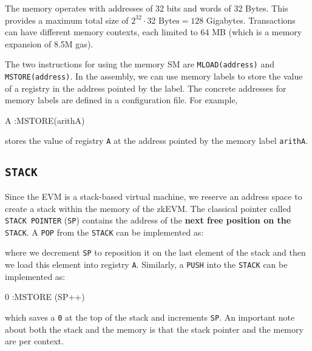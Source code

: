The memory operates with addresses of 32 bits and words of 32 Bytes. This provides a maximum total size of $2^{32} \cdot 32 \text{ Bytes}=128$ Gigabytes. Transactions can have different memory contexts, each limited to 64 MB (which is a memory expansion of 8.5M gas). 

The two instructions for using the memory SM are \texttt{MLOAD(address)} and \texttt{MSTORE(address)}. In the assembly, we can use memory labels to store the value of a registry in the address pointed by the label. The concrete addresses for memory labels are defined in a configuration file. For example, 

\begin{zkasm}
A		:MSTORE(arithA)
\end{zkasm}

stores the value of registry \texttt{A} at the address pointed by the memory label \texttt{arithA}. 






\subsection{\texttt{STACK}}

Since the EVM is a stack-based virtual machine, we reserve an address space to create a stack within the memory of the zkEVM. The classical pointer called \texttt{STACK POINTER} (\texttt{SP}) contains the address of the \textbf{next free position on the} \texttt{STACK}. A \texttt{POP} from the \texttt{STACK} can be implemented as:



where we decrement \texttt{SP} to reposition it on the last element of the stack and
then we load this element into registry \texttt{A}. Similarly, a \texttt{PUSH} into the \texttt{STACK} can be implemented as:

\begin{zkasm}
0		:MSTORE (SP++)
\end{zkasm}

which saves a \texttt{0} at the top of the stack and increments \texttt{SP}. An important note about both the stack and the memory is that the stack pointer and the memory are per context.








